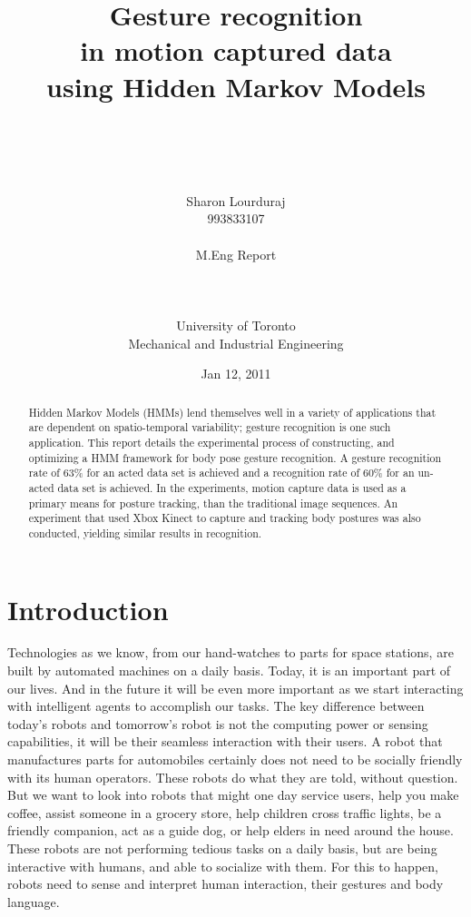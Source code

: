 \documentclass[]{report}   %
\begin{document}
\title{Gesture recognition\\ in motion captured data \\using Hidden Markov Models\\\\\\}   %
\author{Sharon Lourduraj\\993833107\\\\M.Eng Report\\\\\\\\University of Toronto\\Mechanical and Industrial Engineering}         %
\date{Jan 12, 2011}    %
\maketitle

\begin{abstract}
Hidden Markov Models (HMMs) lend themselves well in a variety of applications that are dependent on spatio-temporal variability; gesture recognition is one such application. This report details the experimental process of constructing, and optimizing a HMM framework for body pose gesture recognition. A gesture recognition rate of 63\% for an acted data set is achieved and a recognition rate of 60\% for an un-acted data set is achieved. In the experiments, motion capture data is used as a primary means for posture tracking, than the traditional image sequences. An experiment that used Xbox Kinect to capture and tracking body postures was also conducted, yielding similar results in recognition.

\end{abstract}
\tableofcontents
\chapter{Introduction}             %
Technologies as we know, from our hand-watches to parts for space stations, are built by automated machines on a daily basis. Today, it is an important part of our lives. And in the future it will be even more important as we start interacting with intelligent agents to accomplish our tasks. The key difference between today's robots and tomorrow's robot is not the computing power or sensing capabilities, it will be their seamless interaction with their users. A robot that manufactures parts for automobiles certainly does not need to be socially friendly with its human operators. These robots do what they are told, without question. But we want to look into robots that might one day service users, help you make coffee, assist someone in a grocery store, help children cross traffic lights, be a friendly companion, act as a guide dog, or help elders in need around the house. These robots are not performing tedious tasks on a daily basis, but are being interactive with humans, and able to socialize with them. For this to happen, robots need to sense and interpret human interaction, their gestures and body language.
\end{document}
